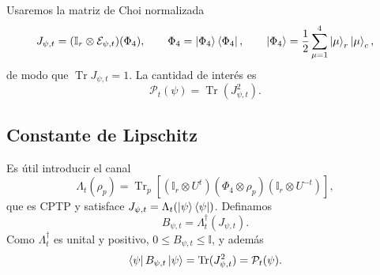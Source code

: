 Usaremos la matriz de Choi normalizada
\begin{equation}
    J_{\psi,t}
    =
    (\mathbb I_r\otimes\mathcal E_{\psi,t})(\Phi_4),
    \qquad
    \Phi_4=\ket{\Phi_4}\bra{\Phi_4},
    \qquad
    \ket{\Phi_4}
    =
    \frac{1}{2}\sum_{\mu=1}^{4}
    \ket{\mu}_r\ket{\mu}_c,
\end{equation}
de modo que $\operatorname{Tr}J_{\psi,t}=1$. La cantidad de interés es
\begin{equation}
    \mathcal P_t(\psi)
    =
    \operatorname{Tr}\left(J_{\psi,t}^2\right).
    \label{eq:ChoiPurityConcentration}
\end{equation}

\subsection{Constante de Lipschitz}

Es útil introducir el canal
\begin{equation}
    \Lambda_t(\rho_p)
    =
    \operatorname{Tr}_p\left[
        (\mathbb I_r\otimes U^t)
        (\Phi_4\otimes\rho_p)
        (\mathbb I_r\otimes U^{-t})
    \right],
\end{equation}
que es CPTP y satisface
$J_{\psi,t}=\Lambda_t(\ket{\psi}\bra{\psi})$.
Definamos
\begin{equation}
    B_{\psi,t}
    =
    \Lambda_t^\dagger(J_{\psi,t}).
\end{equation}
Como $\Lambda_t^\dagger$ es unital y positivo,
$0\leq B_{\psi,t}\leq\mathbb I$, y además
\begin{equation}
    \bra{\psi}B_{\psi,t}\ket{\psi}
    =
    \operatorname{Tr}(J_{\psi,t}^2)
    =
    \mathcal P_t(\psi).
\end{equation}

